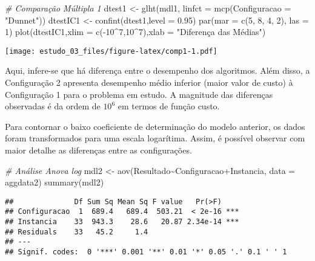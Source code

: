 \documentclass[
]{article}
\newenvironment{Shaded}{\begin{snugshade}}{\end{snugshade}}
\newcommand{\AttributeTok}[1]{\textcolor[rgb]{0.77,0.63,0.00}{#1}}
\newcommand{\CommentTok}[1]{\textcolor[rgb]{0.56,0.35,0.01}{\textit{#1}}}
\newcommand{\DecValTok}[1]{\textcolor[rgb]{0.00,0.00,0.81}{#1}}
\newcommand{\FloatTok}[1]{\textcolor[rgb]{0.00,0.00,0.81}{#1}}
\newcommand{\FunctionTok}[1]{\textcolor[rgb]{0.00,0.00,0.00}{#1}}
\newcommand{\NormalTok}[1]{#1}
\newcommand{\OtherTok}[1]{\textcolor[rgb]{0.56,0.35,0.01}{#1}}
\newcommand{\SpecialCharTok}[1]{\textcolor[rgb]{0.00,0.00,0.00}{#1}}
\newcommand{\StringTok}[1]{\textcolor[rgb]{0.31,0.60,0.02}{#1}}
\begin{document}
\begin{Shaded}
\begin{Highlighting}[]
\CommentTok{\# Comparação Múltipla 1}
\NormalTok{dtest1 }\OtherTok{\textless{}{-}} \FunctionTok{glht}\NormalTok{(mdl1, }\AttributeTok{linfct =} \FunctionTok{mcp}\NormalTok{(}\AttributeTok{Configuracao =} \StringTok{"Dunnet"}\NormalTok{))}
\NormalTok{dtestIC1 }\OtherTok{\textless{}{-}} \FunctionTok{confint}\NormalTok{(dtest1,}\AttributeTok{level =} \FloatTok{0.95}\NormalTok{)}
\FunctionTok{par}\NormalTok{(}\AttributeTok{mar =} \FunctionTok{c}\NormalTok{(}\DecValTok{5}\NormalTok{, }\DecValTok{8}\NormalTok{, }\DecValTok{4}\NormalTok{, }\DecValTok{2}\NormalTok{), }\AttributeTok{las =} \DecValTok{1}\NormalTok{)}
\FunctionTok{plot}\NormalTok{(dtestIC1,}\AttributeTok{xlim =} \FunctionTok{c}\NormalTok{(}\SpecialCharTok{{-}}\DecValTok{10}\SpecialCharTok{\^{}}\DecValTok{7}\NormalTok{,}\DecValTok{10}\SpecialCharTok{\^{}}\DecValTok{7}\NormalTok{),}\AttributeTok{xlab =} \StringTok{"Diferença das Médias"}\NormalTok{)}
\end{Highlighting}
\end{Shaded}

\texttt{[image: estudo\_03\_files/figure-latex/comp1-1.pdf]}

Aqui, infere-se que há diferença entre o desempenho dos algoritmos. Além
disso, a Configuração 2 apresenta desempenho médio inferior (maior valor
de custo) à Configuração 1 para o problema em estudo. A magnitude das
diferenças observadas é da ordem de \(10^6\) em termos de função custo.

Para contornar o baixo coeficiente de determinação do modelo anterior,
os dados foram transformados para uma escala logarítima. Assim, é
possível observar com maior detalhe as diferenças entre as
configurações.

\begin{Shaded}
\begin{Highlighting}[]
\CommentTok{\# Análise Anova log}
\NormalTok{mdl2 }\OtherTok{\textless{}{-}} \FunctionTok{aov}\NormalTok{(Resultado}\SpecialCharTok{\textasciitilde{}}\NormalTok{Configuracao}\SpecialCharTok{+}\NormalTok{Instancia, }\AttributeTok{data =}\NormalTok{ aggdata2)}
\FunctionTok{summary}\NormalTok{(mdl2)}
\end{Highlighting}
\end{Shaded}

\begin{verbatim}
##              Df Sum Sq Mean Sq F value   Pr(>F)    
## Configuracao  1  689.4   689.4  503.21  < 2e-16 ***
## Instancia    33  943.3    28.6   20.87 2.34e-14 ***
## Residuals    33   45.2     1.4                     
## ---
## Signif. codes:  0 '***' 0.001 '**' 0.01 '*' 0.05 '.' 0.1 ' ' 1
\end{verbatim}
\end{document}
